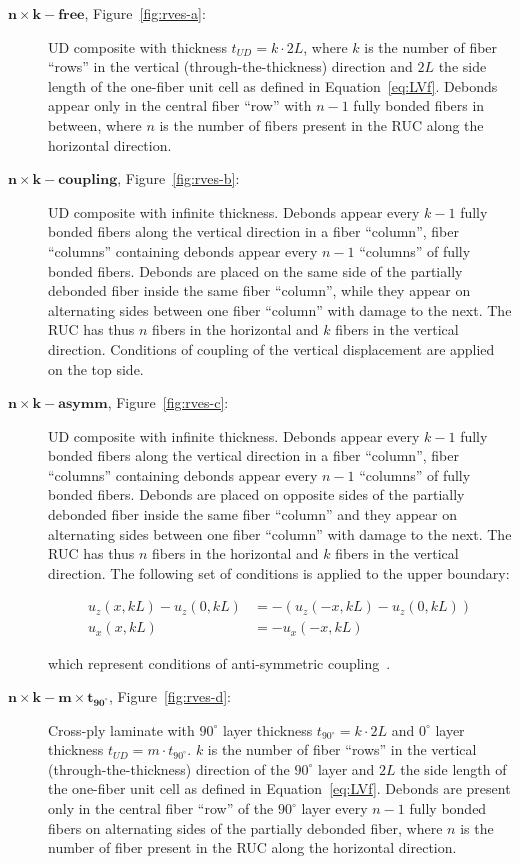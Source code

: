 \documentclass[12pt,a4paper]{article}
\begin{document}
\begin{description}
\item [$\mathbf{n\times k-free}$, Figure~\ref{fig:rves-a}: ]UD composite with thickness $t_{UD}=k\cdot2L$, where $k$ is the number of fiber ``rows'' in the vertical (through-the-thickness) direction and $2L$ the side length of the one-fiber unit cell as defined in Equation~\ref{eq:LVf}. Debonds appear only in the central fiber ``row'' with $n-1$ fully bonded fibers in between, where $n$ is the number of fibers present in the RUC along the horizontal direction.
\item [$\mathbf{n\times k-coupling}$, Figure~\ref{fig:rves-b}: ]UD composite with infinite thickness. Debonds appear every $k-1$ fully bonded fibers along the vertical direction in a fiber ``column'', fiber ``columns'' containing debonds appear every $n-1$ ``columns'' of fully bonded fibers. Debonds are placed on the same side of the partially debonded fiber inside the same fiber ``column'', while they appear on alternating sides between one fiber ``column'' with damage to the next. The RUC has thus $n$ fibers in the horizontal and $k$ fibers in the vertical direction. Conditions of coupling of the vertical displacement are applied on the top side.
\item [$\mathbf{n\times k-asymm}$, Figure~\ref{fig:rves-c}: ]UD composite with infinite thickness. Debonds appear every $k-1$ fully bonded fibers along the vertical direction in a fiber ``column'', fiber ``columns'' containing debonds appear every $n-1$ ``columns'' of fully bonded fibers. Debonds are placed on opposite sides of the partially debonded fiber inside the same fiber ``column'' and they appear on alternating sides between one fiber ``column'' with damage to the next. The RUC has thus $n$ fibers in the horizontal and $k$ fibers in the vertical direction. The following set of conditions is applied to the upper boundary:

\begin{equation}\label{eq:asymm}
\begin{aligned}
u_{z}\left(x,kL\right)-u_{z}\left(0,kL\right)&=-\left(u_{z}\left(-x,kL\right)-u_{z}\left(0,kL\right)\right)\\
u_{x}\left(x,kL\right)&=-u_{x}\left(-x,kL\right)
\end{aligned}
\end{equation}

which represent conditions of anti-symmetric coupling~\cite{DiStasio2019b}.

\item [$\mathbf{n\times k-m\times t_{90^{\circ}}}$, Figure~\ref{fig:rves-d}: ]Cross-ply laminate with $90^{\circ}$ layer thickness $t_{90^{\circ}}=k\cdot2L$ and $0^{\circ}$ layer thickness $t_{UD}=m\cdot t_{90^{\circ}}$. $k$ is the number of fiber ``rows'' in the vertical (through-the-thickness) direction of the $90^{\circ}$ layer and $2L$ the side length of the one-fiber unit cell as defined in Equation~\ref{eq:LVf}. Debonds are present only in the central fiber ``row'' of the $90^{\circ}$ layer every $n-1$ fully bonded fibers on alternating sides of the partially debonded fiber, where $n$ is the number of fiber present in the RUC along the horizontal direction.
\end{description}
\end{document}
